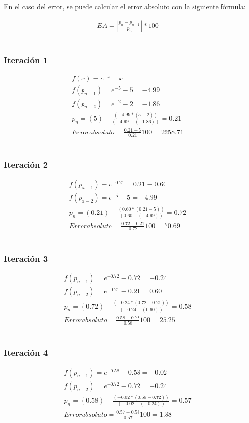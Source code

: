 \documentclass[10pt,technote]{IEEEtran}
\begin{document}
En el caso del error, se puede calcular el error absoluto con la siguiente fórmula:

\begin{gather*}
    EA = |\frac{p_n - p_{n-1}}{p_n}|*100
\end{gather*} \\

\subsubsection{Iteración 1}
\begin{gather*}
    f(x) = e^{-x} - x \\
    f(p_{n-1}) = e^{-5} - 5 = -4.99 \\
    f(p_{n-2}) = e^{-2} - 2 = -1.86 \\
    p_n = (5)- \frac{(-4.99*(5-2))}{(-4.99-(-1.86))} = 0.21 \\
    Error absoluto = \frac{0.21-5}{0.21}100 = 2258.71
\end{gather*} \\

\subsubsection{Iteración 2}
\begin{gather*}
    f(p_{n-1}) = e^{-0.21} - 0.21 = 0.60 \\
    f(p_{n-2}) = e^{-5} - 5 = -4.99 \\
    p_n = (0.21)- \frac{(0.60*(0.21-5))}{(0.60-(-4.99))} = 0.72 \\
    Error absoluto = \frac{0.72-0.21}{0.72}100 = 70.69
\end{gather*} \\

\subsubsection{Iteración 3}
\begin{gather*}
    f(p_{n-1}) = e^{-0.72} - 0.72 = -0.24 \\
    f(p_{n-2}) = e^{-0.21} - 0.21 = 0.60 \\
    p_n = (0.72)- \frac{(-0.24*(0.72-0.21))}{(-0.24-(0.60))} = 0.58 \\
    Error absoluto = \frac{0.58-0.72}{0.58}100 = 25.25
\end{gather*} \\

\subsubsection{Iteración 4}
\begin{gather*}
    f(p_{n-1}) = e^{-0.58} - 0.58 = -0.02 \\
    f(p_{n-2}) = e^{-0.72} - 0.72 = -0.24 \\
    p_n = (0.58)- \frac{(-0.02*(0.58-0.72))}{(-0.02-(-0.24))} = 0.57 \\
    Error absoluto = \frac{0.57-0.58}{0.57}100 = 1.88
\end{gather*} \\
\end{document}

